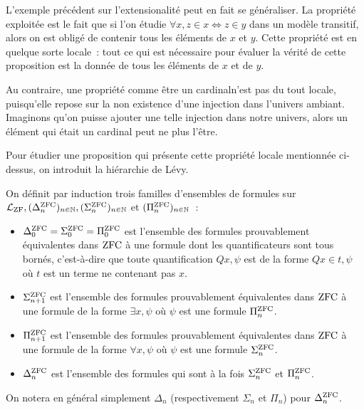 L'exemple précédent sur l'extensionalité peut en fait se généraliser. La
propriété exploitée est le fait que si l'on étudie
$\forall x, z \in x \iff z \in y$ dans un modèle transitif, alors on est obligé
de contenir tous les éléments de $x$ et $y$. Cette propriété est en quelque
sorte locale~: tout ce qui est nécessaire pour évaluer la vérité de cette
proposition est la donnée de tous les éléments de $x$ et de $y$.

Au contraire, une propriété comme \og être un cardinal\fg n'est pas du tout
locale, puisqu'elle repose sur la non existence d'une injection dans l'univers
ambiant. Imaginons qu'on puisse ajouter une telle injection dans notre univers,
alors un élément qui était un cardinal peut ne plus l'être.

Pour étudier une proposition qui présente cette propriété locale mentionnée
ci-dessus, on introduit la hiérarchie de Lévy.

\begin{definition}
  On définit par induction trois familles d'ensembles de formules sur
  $\mathcal L_{\operatorname{ZF}}, (\Delta^{\operatorname{ZFC}}_n)_{n\in\mathbb N},
  (\Sigma^{\operatorname{ZFC}}_n)_{n\in\mathbb N}$
  et $(\Pi^{\operatorname{ZFC}}_n)_{n \in \mathbb N}$~:
  \begin{itemize}
  \item $\Delta^{\operatorname{ZFC}}_0=\Sigma^{\operatorname{ZFC}}_0=\Pi^{\operatorname{ZFC}}_0$ est l'ensemble des formules
    prouvablement équivalentes dans $\operatorname{ZFC}$ à une formule dont les
    quantificateurs sont tous bornés, c'est-à-dire que toute quantification
    $Q x, \psi$ est de la forme $Q x \in t, \psi$ où $t$ est un terme ne
    contenant pas $x$.
  \item $\Sigma^{\operatorname{ZFC}}_{n+1}$ est l'ensemble des formules prouvablement
    équivalentes
    dans $\operatorname{ZFC}$ à une formule de la forme
    $\exists x, \psi$ où $\psi$ est une formule $\Pi^{\operatorname{ZFC}}_n$.
  \item $\Pi^{\operatorname{ZFC}}_{n+1}$ est l'ensemble des formules prouvablement équivalentes
    dans $\operatorname{ZFC}$ à une formule de la forme $\forall x, \psi$ où $\psi$ est une
    formule $\Sigma^{\operatorname{ZFC}}_n$.
  \item $\Delta^{\operatorname{ZFC}}_n$ est l'ensemble des formules qui sont à la fois
    $\Sigma^{\operatorname{ZFC}}_n$ et $\Pi^{\operatorname{ZFC}}_n$.
  \end{itemize}

  On notera en général simplement $\Delta_n$ (respectivement $\Sigma_n$ et
  $\Pi_n$) pour $\Delta^{\operatorname{ZFC}}_n$.
\end{definition}


